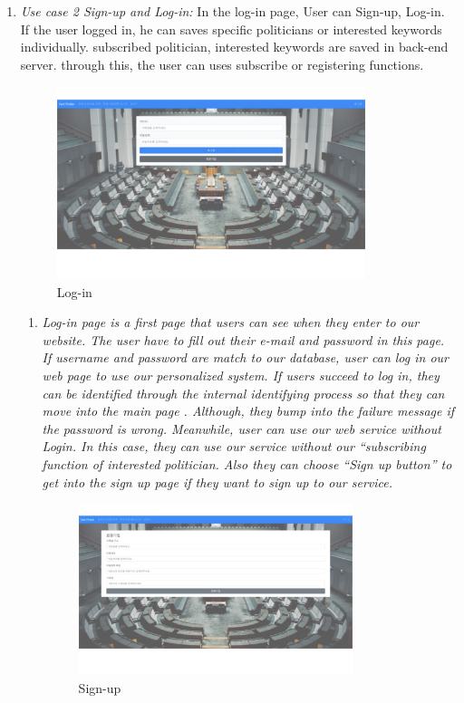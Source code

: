 \documentclass[conference]{IEEEtran}
\begin{document}
\begin{enumerate}
\item \textit{Use case 2 Sign-up and Log-in: } In the log-in page, User can Sign-up, Log-in. If the user logged in, he can saves specific politicians or interested keywords individually. subscribed politician, interested keywords are saved in back-end server. through this, the user can uses subscribe or registering functions.\\

\begin{figure}[htbp]
\centerline{\includegraphics[width=90mm,scale=0.5]{fig/usecase3.png}}
\caption{Log-in}
\label{fig}
\end{figure}

\begin{enumerate}
    \item\textit{Log-in page is a first page that users can see when they enter to our website. The user have to fill out their e-mail and password in this page.  If username and password are match to our database, user can log in our web page to use our personalized system. If users succeed to log in, they can be identified through the internal identifying process so that they can move into the main page . Although, they bump into the failure message if the password is wrong. Meanwhile, user can use our web service without Login. In this case, they can use our service without our “subscribing function of interested politician. Also they can choose “Sign up button” to get into the sign up page  if they want to sign up to our service.
} \\

\begin{figure}[htbp]
\centerline{\includegraphics[width=80mm,scale=0.5]{fig/usecase4.png}}
\caption{Sign-up}
\label{fig}
\end{figure}


\end{enumerate}
\end{enumerate}
\end{document}
